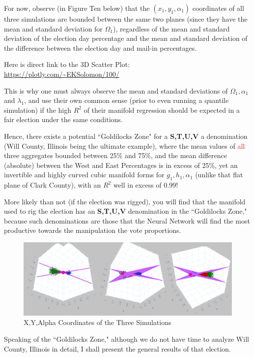 \documentclass[preprint,13pt]{elsarticle}
\begin{document}
For now, observe (in Figure Ten below) that the $(x_{1},y_{1},\alpha_{1})$ coordinates of all three simulations are bounded between the same two planes (since they have the mean and standard deviation for $\Omega_{1}$), regardless of the mean and standard deviation of the election day percentage and the mean and standard deviation of the difference between the election day and mail-in percentages.

Here is direct link to the 3D Scatter Plot:\\
\url{https://plotly.com/~EKSolomon/100/}

This is why one must always observe the mean and standard deviations of $\Omega_{1}, \alpha_{1}$ and $\lambda_{1}$, and use their own common sense (prior to even running a quantile simulation) if the high $R^2$ of their manifold regression should be expected in a fair election under the same conditions.

Hence, there exists a potential ``Goldilocks Zone" for a \textbf{S,T,U,V} a denomination (Will County, Illinois being the ultimate example), where the mean values of \textcolor{red}{all} three aggregates bounded between 25\% and 75\%, and the mean difference (absolute) between the West and East Percentages is in excess of 25\%, yet an invertible and highly curved cubic manifold forms for $g_{1},h_{1},\alpha_{1}$ (unlike that flat plane of Clark County), with an $R^2$ well in excess of 0.99!

More likely than not (if the election was rigged), you will find that the manifold used to rig the election has an \textbf{S,T,U,V} denomination in the ``Goldilocks Zone," because such denominations are those that the Neural Network will find the most productive towards the manipulation the vote proportions.

\begin{figure}[bp!]
\begin{center}
\caption{X,Y,Alpha Coordinates of the Three Simulations}
\includegraphics[width=400pt]{Twixtmebb.png}
\end{center}
\end{figure}
\newpage
Speaking of the ``Goldilocks Zone," although we do not have time to analyze Will County, Illinois in detail, I shall present the general results of that election.
\end{document}
